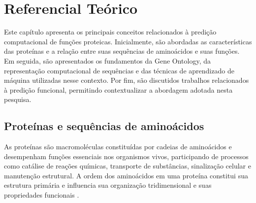     



\section{Referencial Teórico}
\label{sec:referencial-teorico}

Este capítulo apresenta os principais conceitos relacionados à predição computacional de funções proteicas. Inicialmente, são abordadas as características das proteínas e a relação entre suas sequências de aminoácidos e suas funções. Em seguida, são apresentados os fundamentos da Gene Ontology, da representação computacional de sequências e das técnicas de aprendizado de máquina utilizadas nesse contexto. Por fim, são discutidos trabalhos relacionados à predição funcional, permitindo contextualizar a abordagem adotada nesta pesquisa.


\subsection{Proteínas e sequências de aminoácidos}
\label{subsec:proteinas-sequencias}

As proteínas são macromoléculas constituídas por cadeias de aminoácidos e desempenham funções essenciais nos organismos vivos, participando de processos como catálise de reações químicas, transporte de substâncias, sinalização celular e manutenção estrutural. A ordem dos aminoácidos em uma proteína constitui sua estrutura primária e influencia sua organização tridimensional e suas propriedades funcionais \cite{branden1999}.

